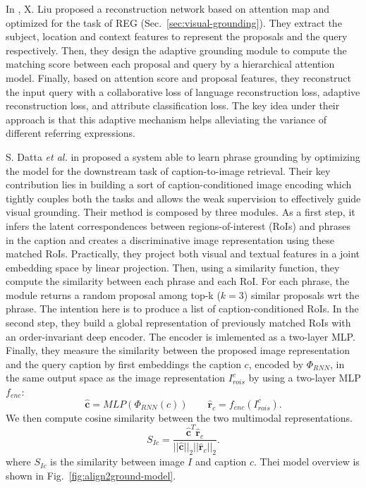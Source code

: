 In \cite{liu2019adaptive}, X. Liu \etal{} proposed a reconstruction
network based on attention map and optimized for the task of REG
(Sec.~\ref{sec:visual-grounding}). They extract the subject, location
and context features to represent the proposals and the query
respectively. Then, they design the adaptive grounding module to
compute the matching score between each proposal and query by a
hierarchical attention model. Finally, based on attention score and
proposal features, they reconstruct the input query with a
collaborative loss of language reconstruction loss, adaptive
reconstruction loss, and attribute classification loss. The key idea
under their approach is that this adaptive mechanism helps alleviating
the variance of different referring expressions.

S. Datta \textit{et al.} in \cite{datta2019align2ground} proposed a
system able to learn phrase grounding by optimizing the model for the
downstream task of caption-to-image retrieval. Their key contribution
lies in building a sort of caption-conditioned image encoding which
tightly couples both the tasks and allows the weak supervision to
effectively guide visual grounding. Their method is composed by three
modules. As a first step, it infers the latent correspondences between
regions-of-interest (RoIs) and phrases in the caption and creates a
discriminative image representation using these matched RoIs.
Practically, they project both visual and textual features in a joint
embedding space by linear projection. Then, using a similarity
function, they compute the similarity between each phrase and each
RoI. For each phrase, the module returns a random proposal among top-k
($k = 3$) similar proposals wrt the phrase. The intention here is to produce a list of caption-conditioned RoIs. In the second step, they build a global representation of previously matched RoIs with an order-invariant deep encoder. The encoder is imlemented as a two-layer MLP. Finally, they measure the similarity between the proposed image representation and the
query caption by first embeddings the caption $c$, encoded
by $\Phi_{RNN}$, in the same output space as the image representation  $I^c_{rois}$ by using a two-layer MLP $f_{enc}$:
\begin{equation}
  \hat{\bm{c}} = MLP (\Phi_{RNN} (c)) \qquad \hat{\bm{r}}_c = f_{enc} (I^c_{rois}).
\end{equation}
We then compute cosine
similarity between the two multimodal representations.
\begin{equation}
  S_{Ic} = \frac{ \hat{\bm{c}}^T \hat{\bm{r}}_c }{ || \hat{\bm{c}} ||_2 || \hat{\bm{r}}_c ||_2 }.
\end{equation}
where $S_{Ic}$ is the similarity between image $I$ and caption $c$. Thei model overview is shown in Fig.~\ref{fig:align2ground-model}.

